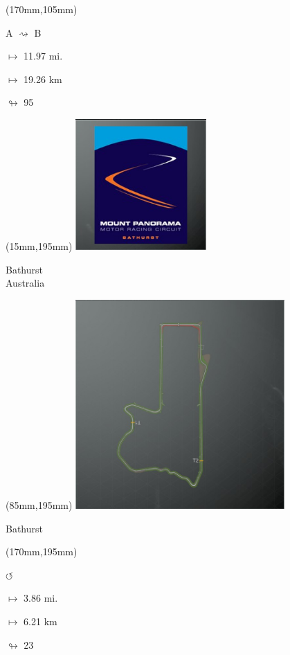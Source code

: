 \begin{textblock*}{30mm}(170mm,105mm)%
\par A $\rightsquigarrow$ B
\Large
\par$\mapsto$ 11.97 mi.
\par$\mapsto$ 19.26 km
\par$\looparrowright$ 95
\end{textblock*}
\begin{textblock*}{60mm}(15mm,195mm)%
\includegraphics[width=50mm]{LG/2015-05-20_00087.png}
\par Bathurst\\ Australia
\end{textblock*}
\begin{textblock*}{80mm}(85mm,195mm)%
\includegraphics[width=80mm]{TR/2015-05-20_00036.png}
\centerline{Bathurst}
\end{textblock*}
\begin{textblock*}{30mm}(170mm,195mm)%
\par \Huge$\circlearrowleft$
\Large
\par$\mapsto$ 3.86 mi.
\par$\mapsto$ 6.21 km
\par$\looparrowright$ 23
\end{textblock*}
\null\newpage

